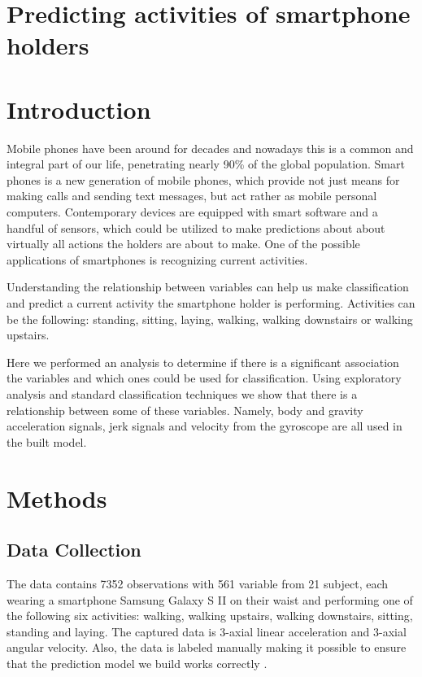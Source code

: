 \documentclass[a4paper,12pt]{extarticle}
\begin{document}
\section*{Predicting activities of smartphone holders}

\section{Introduction}

Mobile phones have been around for decades and nowadays this is a common and integral part of our life, penetrating nearly 90\% of the global population. \cite{source:wiki.mobile.phones} Smart phones is a new generation of mobile phones, which provide not just means for making calls and sending text messages, but act rather as mobile personal computers. Contemporary devices are equipped with smart software and a handful of sensors, which could be utilized to make predictions about about virtually all actions the holders are about to make. One of the possible applications of smartphones is recognizing current activities.

Understanding the relationship between variables can help us make classification and predict a current activity the smartphone holder is performing. Activities can be the following: standing, sitting, laying, walking, walking downstairs or walking upstairs.

Here we performed an analysis to determine if there is a significant association the variables and which ones could be used for classification. Using exploratory analysis and standard classification techniques we show that there is a relationship between some of these variables. Namely, body and gravity acceleration signals, jerk signals and velocity from the gyroscope are all used in the built model.


\section{Methods}

\subsection{Data Collection}

The data contains 7352 observations with 561 variable from 21 subject, each wearing a smartphone Samsung Galaxy S II on their waist and performing one of the following six activities: walking, walking upstairs, walking downstairs, sitting, standing and laying. The captured data is 3-axial linear acceleration and 3-axial angular velocity. Also, the data is labeled manually making it possible to ensure that the prediction model we build works correctly \cite{source:machineleariningrepo}.
\end{document}
